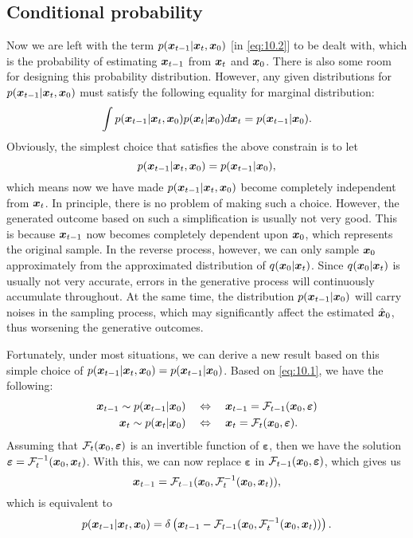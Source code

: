 \subsection{Conditional probability}
Now we are left with the term $p(\bm{x}_{t-1}|\bm{x}_{t},\bm{x}_0)$ [in \cref{eq:10.2}] to be dealt with, which is the probability of estimating $\bm{x}_{t-1}$ from $\bm{x}_{t}$ and $\bm{x}_0$. There is also some room for designing this probability distribution. However, any given distributions for $p(\bm{x}_{t-1}|\bm{x}_{t},\bm{x}_0)$ must satisfy the following equality for marginal distribution:
\begin{equation}
    \label{eq:10.7}
    \int p(\bm{x}_{t-1}|\bm{x}_{t},\bm{x}_0 )p(\bm{x}_{t}|\bm{x}_0)d\bm{x}_{t} = p(\bm{x}_{t-1}|\bm{x}_0).
\end{equation}
Obviously, the simplest choice that satisfies the above constrain is to let
\begin{equation}
    \label{eq:10.8}
    p(\bm{x}_{t-1}|\bm{x}_{t},\bm{x}_0 ) = p(\bm{x}_{t-1}|\bm{x}_0),
\end{equation}
which means now we have made $p(\bm{x}_{t-1}|\bm{x}_{t},\bm{x}_0 )$ become completely independent from $\bm{x}_{t}$. In principle, there is no problem of making such a choice. However, the generated outcome based on such a simplification is usually not very good. This is because $\bm{x}_{t-1}$ now becomes completely dependent upon $\bm{x}_0$, which represents the original sample. In the reverse process, however, we can only sample $\bm{x}_0$ approximately from the approximated distribution of $q(\bm{x}_0|\bm{x}_{t})$. Since $q(\bm{x}_0|\bm{x}_{t})$ is usually not very accurate, errors in the generative process will continuously accumulate throughout. At the same time, the distribution $p(\bm{x}_{t-1}|\bm{x}_0)$ will carry noises in the sampling process, which may significantly affect the estimated $\hat{\bm{x}}_0$, thus worsening the generative outcomes.

Fortunately, under most situations, we can derive a new result based on this simple choice of $p(\bm{x}_{t-1}|\bm{x}_{t},\bm{x}_0 ) = p(\bm{x}_{t-1}|\bm{x}_0)$. Based on \cref{eq:10.1}, we have the following:
\begin{align}
    \bm{x}_{t-1}\sim p(\bm{x}_{t-1}|\bm{x}_0) \quad &\Leftrightarrow \quad \bm{x}_{t-1}=\mathcal{F}_{t-1}(\bm{x}_0,\bm{\varepsilon})\nonumber\\
    \bm{x}_{t}\sim p(\bm{x}_{t}|\bm{x}_0)\quad &\Leftrightarrow\quad \bm{x}_{t}=\mathcal{F}_{t}(\bm{x}_0,\bm{\varepsilon}). \label{eq:10.9}
\end{align}
Assuming that $\mathcal{F}_{t}(\bm{x}_0,\bm{\varepsilon})$ is an invertible function of $\bm{\varepsilon}$, then we have the solution $\bm{\varepsilon}=\mathcal{F}_t^{-1}(\bm{x}_0,\bm{x}_{t})$. With this, we can now replace $\bm{\varepsilon}$ in $\mathcal{F}_{t-1}(\bm{x}_0,\bm{\varepsilon})$, which gives us
\begin{equation}
    \label{eq:10.10}
    \bm{x}_{t-1} = \mathcal{F}_{t-1}(\bm{x}_0,\mathcal{F}_t^{-1}(\bm{x}_0,\bm{x}_{t})),
\end{equation}
which is equivalent to
\begin{equation}
    \label{eq:10.11}
    p(\bm{x}_{t-1}|\bm{x}_{t},\bm{x}_0 ) = \delta\left(\bm{x}_{t-1} - \mathcal{F}_{t-1}(\bm{x}_0,\mathcal{F}_t^{-1}(\bm{x}_0,\bm{x}_{t})) \right).
\end{equation}


